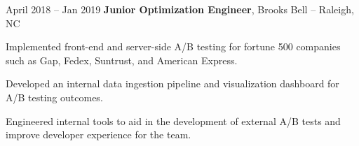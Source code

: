 \vspace{0.2 cm}

\begin{twocolentry}{
		April 2018 – Jan 2019
	}
    \textbf{Junior Optimization Engineer}, Brooks Bell -- Raleigh, NC\end{twocolentry}

\vspace{0.10 cm}
\begin{onecolentry}
	\begin{highlights}
        \item Implemented front-end and server-side A/B testing for fortune 500 companies such as Gap, Fedex, Suntrust,
and American Express.
        \item Developed an internal data ingestion pipeline and visualization dashboard for A/B testing outcomes.
        \item Engineered internal tools to aid in the development of external A/B tests and improve developer experience
for the team.
	\end{highlights}
\end{onecolentry}

%
%




